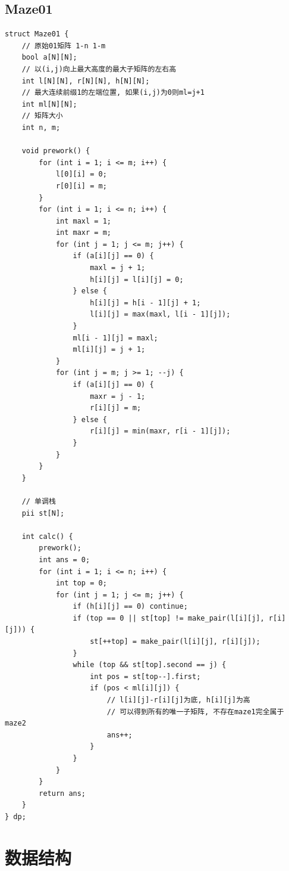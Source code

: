 \documentclass[twoside]{article}
\begin{document}
\subsection{Maze01}
\begin{lstlisting}
struct Maze01 {
    // 原始01矩阵 1-n 1-m
    bool a[N][N];
    // 以(i,j)向上最大高度的最大子矩阵的左右高
    int l[N][N], r[N][N], h[N][N];
    // 最大连续前缀1的左端位置, 如果(i,j)为0则ml=j+1
    int ml[N][N];
    // 矩阵大小
    int n, m;

    void prework() {
        for (int i = 1; i <= m; i++) {
            l[0][i] = 0;
            r[0][i] = m;
        }
        for (int i = 1; i <= n; i++) {
            int maxl = 1;
            int maxr = m;
            for (int j = 1; j <= m; j++) {
                if (a[i][j] == 0) {
                    maxl = j + 1;
                    h[i][j] = l[i][j] = 0;
                } else {
                    h[i][j] = h[i - 1][j] + 1;
                    l[i][j] = max(maxl, l[i - 1][j]);
                }
                ml[i - 1][j] = maxl;
                ml[i][j] = j + 1;
            }
            for (int j = m; j >= 1; --j) {
                if (a[i][j] == 0) {
                    maxr = j - 1;
                    r[i][j] = m;
                } else {
                    r[i][j] = min(maxr, r[i - 1][j]);
                }
            }
        }
    }

    // 单调栈
    pii st[N];

    int calc() {
        prework();
        int ans = 0;
        for (int i = 1; i <= n; i++) {
            int top = 0;
            for (int j = 1; j <= m; j++) {
                if (h[i][j] == 0) continue;
                if (top == 0 || st[top] != make_pair(l[i][j], r[i][j])) {
                    st[++top] = make_pair(l[i][j], r[i][j]);
                }
                while (top && st[top].second == j) {
                    int pos = st[top--].first;
                    if (pos < ml[i][j]) {
                        // l[i][j]-r[i][j]为底, h[i][j]为高
                        // 可以得到所有的唯一子矩阵, 不存在maze1完全属于maze2
                        ans++;
                    }
                }
            }
        }
        return ans;
    }
} dp;\end{lstlisting}
\clearpage\section{数据结构}
\end{document}
